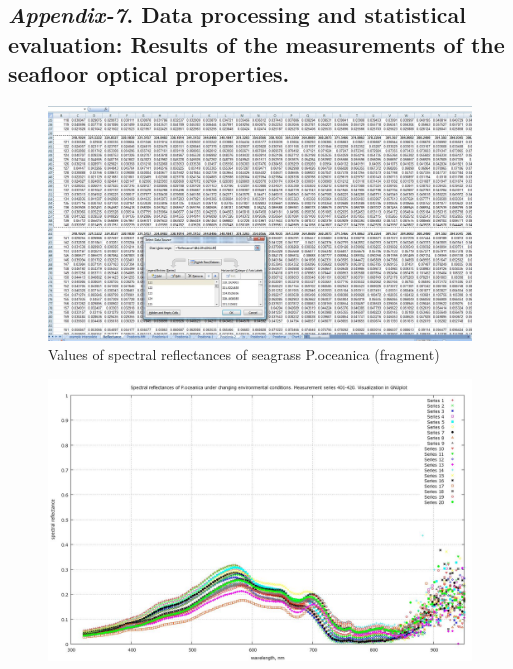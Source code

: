\documentclass[10pt, a4paper]{article}
\begin{document}
\begin{appendices}
\subsection{\textit{Appendix-7}. Data processing and statistical evaluation: Results of the measurements of the seafloor optical properties.}

\begin{figure}[h]
	\begin{center}
		\includegraphics[scale=0.20]{App-1.jpg}
		\caption{Values of spectral reflectances of seagrass P.oceanica (fragment)}
		\label{fig:A.11}
	\end{center}
\end{figure}
\begin{figure}[h]
	\begin{center}
		\includegraphics[scale=0.20]{GNU-401-420.jpg}

\end{center}
\end{figure}
\end{appendices}
\end{document}
